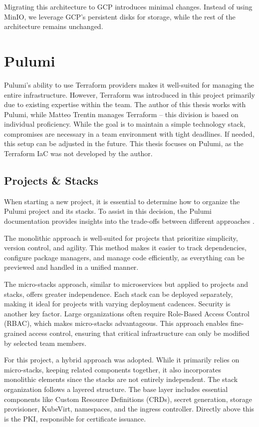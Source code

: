 Migrating this architecture to GCP introduces minimal changes. Instead of using MinIO, we leverage GCP's persistent disks for storage, while the rest of the architecture remains unchanged.

\section{Pulumi}
Pulumi's ability to use Terraform providers makes it well-suited for managing the entire infrastructure. However, Terraform was introduced in this project primarily due to existing expertise within the team. The author of this thesis works with Pulumi, while Matteo Trentin manages Terraform -- this division is based on individual proficiency. While the goal is to maintain a simple technology stack, compromises are necessary in a team environment with tight deadlines. If needed, this setup can be adjusted in the future. This thesis focuses on Pulumi, as the Terraform IaC was not developed by the author.

\subsection{Projects \& Stacks}
When starting a new project, it is essential to determine how to organize the Pulumi project and its stacks. To assist in this decision, the Pulumi documentation provides insights into the trade-offs between different approaches \Parencite{pulumiProjects2025}.

The monolithic approach is well-suited for projects that prioritize simplicity, version control, and agility. This method makes it easier to track dependencies, configure package managers, and manage code efficiently, as everything can be previewed and handled in a unified manner.

The micro-stacks approach, similar to microservices but applied to projects and stacks, offers greater independence. Each stack can be deployed separately, making it ideal for projects with varying deployment cadences. Security is another key factor. Large organizations often require Role-Based Access Control (RBAC), which makes micro-stacks advantageous. This approach enables fine-grained access control, ensuring that critical infrastructure can only be modified by selected team members.

For this project, a hybrid approach was adopted. While it primarily relies on micro-stacks, keeping related components together, it also incorporates monolithic elements since the stacks are not entirely independent. The stack organization follows a layered structure. The base layer includes essential components like Custom Resource Definitions (CRDs), secret generation, storage provisioner, KubeVirt, namespaces, and the ingress controller. Directly above this is the PKI, responsible for certificate issuance. 

